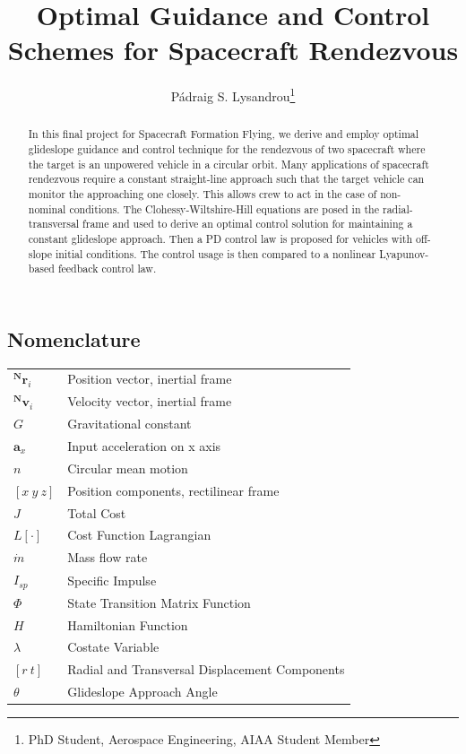 \documentclass[conf]{new-aiaa}
\title{Optimal Guidance and Control Schemes for Spacecraft Rendezvous}
\author{Pádraig S. Lysandrou\footnote{PhD Student, Aerospace Engineering, AIAA Student Member}}
\affil{University of Colorado Boulder, Boulder, Colorado, 80301}
\affil{Final Project for ASEN6014: Spacecraft Formation Flying}
\renewcommand*\arraystretch{0.9}
\begin{document}
\maketitle

\begin{singlespace}
\begin{abstract}
    \begin{itemize}
        In this final project for Spacecraft Formation Flying, we derive and employ optimal glideslope guidance and control technique for the rendezvous of two spacecraft where the target is an unpowered vehicle in a circular orbit. Many applications of spacecraft rendezvous require a constant straight-line approach such that the target vehicle can monitor the approaching one closely. This allows crew to act in the case of non-nominal conditions. The Clohessy-Wiltshire-Hill equations are posed in the radial-transversal frame and used to derive an optimal control solution for maintaining a constant glideslope approach. Then a PD control law is proposed for vehicles with off-slope initial conditions. The control usage is then compared to a nonlinear Lyapunov-based feedback control law.
    \end{itemize}
\end{abstract}

\section*{Nomenclature}
{\renewcommand\arraystretch{1.0}
\noindent\begin{longtable*}{@{}l @{\quad=\quad} l@{}}
$\mathbf{^Nr}_i$  	& Position vector, inertial frame\\
$\mathbf{^Nv}_i$  	& Velocity vector, inertial frame\\
$G$                  & Gravitational constant \\
$\bm{a}_x$          & Input acceleration on x axis \\
$n$               & Circular mean motion \\
$[x \ y \ z]$       & Position components, rectilinear frame \\
$J$             & Total Cost \\
$L[\cdot]$       & Cost Function Lagrangian \\
$\dot{m}$        & Mass flow rate \\
$I_{sp}$        & Specific Impulse \\
$\Phi$          & State Transition Matrix Function\\
$H$             & Hamiltonian Function \\
$\lambda$       & Costate Variable \\
$[r \ t]$       & Radial and Transversal Displacement Components \\
$\theta$        & Glideslope Approach Angle
\end{longtable*}}




\end{singlespace}
\end{document}
